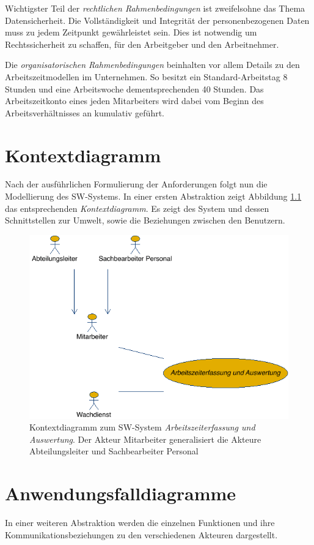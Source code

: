 Wichtigster Teil der \textit{rechtlichen Rahmenbedingungen} ist zweifelsohne das Thema Datensicherheit. Die Vollständigkeit und Integrität der personenbezogenen Daten muss zu jedem Zeitpunkt gewährleistet sein. Dies ist notwendig um Rechtssicherheit zu schaffen, für den Arbeitgeber und den Arbeitnehmer. \newline

Die \textit{organisatorischen Rahmenbedingungen} beinhalten vor allem Details zu den Arbeitszeitmodellen im Unternehmen. So besitzt ein Standard-Arbeitstag 8 Stunden und eine Arbeitswoche dementsprechenden 40 Stunden. Das Arbeitszeitkonto eines jeden Mitarbeiters wird dabei vom Beginn des Arbeitsverhältnisses an kumulativ geführt.

\newpage

\chapter{Kontextdiagramm}
Nach der ausführlichen Formulierung der Anforderungen folgt nun die Modellierung des SW-Systems. In einer ersten Abstraktion zeigt Abbildung \ref{Kontext} das entsprechenden \textit{Kontextdiagramm}. Es zeigt des System und dessen Schnittstellen zur Umwelt, sowie die Beziehungen zwischen den Benutzern.

\begin{figure}[hbp]
	\centering
	\includegraphics[width=0.9\linewidth]{UML/Export/Kontext.png}
	\caption{Kontextdiagramm zum SW-System \textit{Arbeitszeiterfassung und Auswertung}. Der Akteur Mitarbeiter generalisiert die Akteure Abteilungsleiter und Sachbearbeiter Personal}
	\label{Kontext}
\end{figure}

\chapter{Anwendungsfalldiagramme}
In einer weiteren Abstraktion werden die einzelnen Funktionen und ihre Kommunikationsbeziehungen zu den verschiedenen Akteuren dargestellt.

